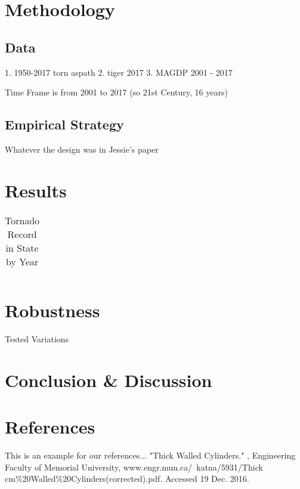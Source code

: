 \documentclass[a4paper]{article}
\begin{document}
\section{Methodology}

\subsection{Data}
1. 1950-2017 torn aspath
2. tiger 2017
3. MAGDP 2001 - 2017

Time Frame is from 2001 to 2017 (so 21st Century, 16 years)

\subsection{Empirical Strategy}
Whatever the design was in Jessie's paper

\section{Results}



\begin{table} [h!]
\centering
\begin{tabular}{l|r}
\end{tabular}
\caption{\label{tab:widgets}Tornado Record in State by Year}
\end{table}

\section{Robustness}
Tested Variations


\section{Conclusion \& Discussion}

\section{References}
This is an example for our references...
"Thick Walled Cylinders." , Engineering Faculty of Memorial University, www.engr.mun.ca/~katna/5931/Thick\\
 cm\%20Walled\%20Cylinders(corrected).pdf. Accessed 19 Dec. 2016.
\end{document}
